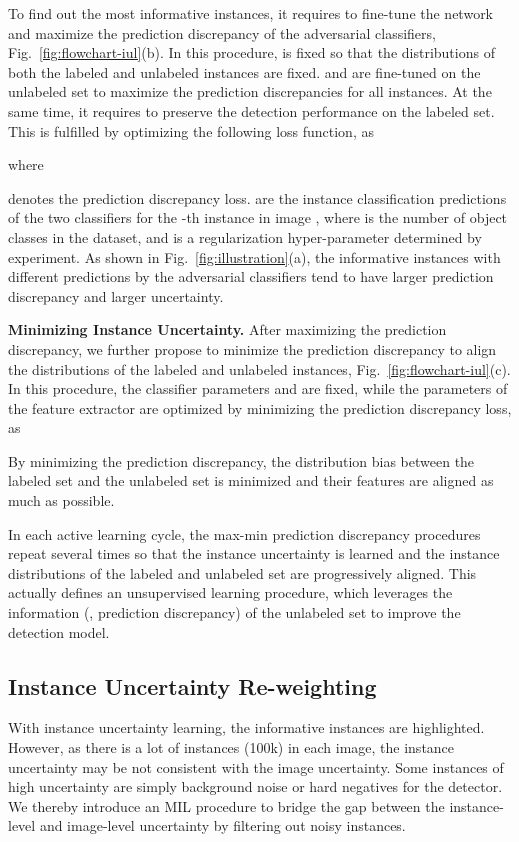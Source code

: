 \documentclass[final]{cvpr}
\begin{document}
To find out the most informative instances, it requires to fine-tune the network and maximize the prediction discrepancy of the adversarial classifiers, Fig.~\ref{fig:flowchart-iul}(b). In this procedure,  is fixed so that the distributions of both the labeled and unlabeled instances are fixed.  and  are fine-tuned on the unlabeled set to maximize the prediction discrepancies for all instances. At the same time, it requires to preserve the detection performance on the labeled set. This is fulfilled by optimizing the following loss function, as 

where 

denotes the prediction discrepancy loss.  are the instance classification predictions of the two classifiers for the -th instance in image , where  is the number of object classes in the dataset, and  is a regularization hyper-parameter determined by experiment. As shown in Fig.~\ref{fig:illustration}(a), the informative instances with different predictions by the adversarial classifiers tend to have larger prediction discrepancy and larger uncertainty.

\textbf{Minimizing Instance Uncertainty.} After maximizing the prediction discrepancy, we further propose to minimize the prediction discrepancy to align the distributions of the labeled and unlabeled instances, Fig.~\ref{fig:flowchart-iul}(c).
In this procedure, the classifier parameters  and  are fixed, while the parameters  of the feature extractor are optimized by minimizing the prediction discrepancy loss, as 

By minimizing the prediction discrepancy, the distribution bias between the labeled set and the unlabeled set is minimized and their features are aligned as much as possible. 

In each active learning cycle, the max-min prediction discrepancy procedures repeat several times so that the instance uncertainty is learned and the instance distributions of the labeled and unlabeled set are progressively aligned. This actually defines an unsupervised learning procedure, which leverages the information (\ie, prediction discrepancy) of the unlabeled set to improve the detection model. 

\subsection{Instance Uncertainty Re-weighting}
With instance uncertainty learning, the informative instances are highlighted. However, as there is a lot of instances (100k) in each image, the instance uncertainty may be not consistent with the image uncertainty. Some instances of high uncertainty are simply background noise or hard negatives for the detector. We thereby introduce an MIL procedure to bridge the gap between the instance-level and image-level uncertainty by filtering out noisy instances.
\end{document}
